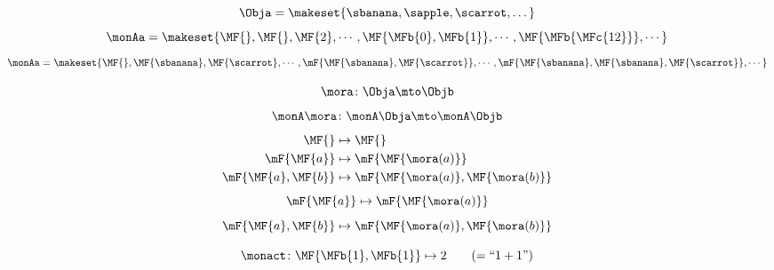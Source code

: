 {\begin{forslides}
        \begin{equation}\label{eq:monad-ex1-set-1}
            \Obja = \makeset{\sbanana, \sapple, \scarrot, \dots}
        \end{equation}
        \begin{equation}\label{eq:monad-ex1-set-2}
            \monAa = \makeset{ \MF{}, \MF{}, \MF{2}, \cdots, \MF{\MFb{0}, \MFb{1}}, \cdots, \MF{\MFb{\MFc{12}}}, \cdots}
        \end{equation}
        \begin{equation}\label{eq:monad-ex1-set-2-bis}
            \monAa = \makeset{ \MF{}, \MF{\sbanana}, \MF{\scarrot}, \cdots, \mF{\MF{\sbanana}, \MF{\scarrot}}, \cdots, \mF{\MF{\sbanana}, \MF{\sbanana}, \MF{\scarrot}}, \cdots}
        \end{equation}

        \begin{equation}\label{eq:monad-ex1-functor-1}
            \mora\colon\Obja\mto\Objb
        \end{equation}
        \begin{equation}\label{eq:monad-ex1-functor-2}
            \monA\mora\colon\monA\Obja\mto\monA\Objb
        \end{equation}
        \begin{equation}\label{eq:monad-ex1-functor-3}
            \begin{aligned}
                \MF{}               & \mapsto \MF{} \\
                \mF{\MF{a}}         & \mapsto \mF{\MF{\mora(a)}} \\
                \mF{\MF{a}, \MF{b}} & \mapsto \mF{\MF{\mora(a)}, \MF{\mora(b)}}
            \end{aligned}
        \end{equation}
        \begin{equation}\label{eq:monad-ex1-functor-4}
            \mF{\MF{a}} \mapsto \mF{\MF{\mora(a)}}
        \end{equation}
        \begin{equation}\label{eq:monad-ex1-functor-5}
            \mF{\MF{a}, \MF{b}} \mapsto \mF{\MF{\mora(a)}, \MF{\mora(b)}}
        \end{equation}

        \begin{equation}\label{eq:monad-ex1-set-3}
            \monact \colon \MF{\MFb{1}, \MFb{1}} \mapsto 2  \qquad (= \text{``$1 + 1$''})
        \end{equation}


\end{forslides}}
